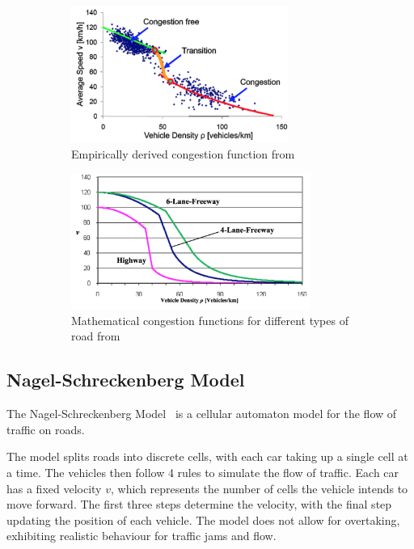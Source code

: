 \documentclass[ %
                    author={Alexander Hill},
                supervisor={Dr. Benjamin Sach},
                    degree={MEng},
                     title={MARMOSET},
                  subtitle={Multi-Agent Route Management using Online Simulation for Efficient Transportation},
                      type={research},
                      year={2016} ]{dissertation}
\begin{document}
\begin{figure}[h]
    \centering
    \begin{subfigure}[b]{0.45\textwidth}
        \centering
        \includegraphics[height=12em]{congestion-graph-1}
        \caption{Empirically derived congestion function from~\cite{traffic-graphs}}\label{fig:congestion-graph}
    \end{subfigure}
    \hspace{1em}
    \begin{subfigure}[b]{0.45\textwidth}
        \centering
        \includegraphics[height=12em]{congestion-graph-2}
        \caption{Mathematical congestion functions for different types of road from~\cite{beejama}}\label{fig:congestion-graph-2}
    \end{subfigure}
    \caption{}
\end{figure}

\subsection{Nagel-Schreckenberg Model} \label{sec:nagel}

The Nagel-Schreckenberg Model~\cite{nagel} is a cellular automaton model for the
flow of traffic on roads.

The model splits roads into discrete cells, with each car taking up a single
cell at a time. The vehicles then follow 4 rules to simulate the flow of
traffic. Each car has a fixed velocity $v$, which represents the number of cells
the vehicle intends to move forward. The first three steps determine the
velocity, with the final step updating the position of each vehicle.  The model
does not allow for overtaking, exhibiting realistic behaviour for traffic jams
and flow.
\end{document}
